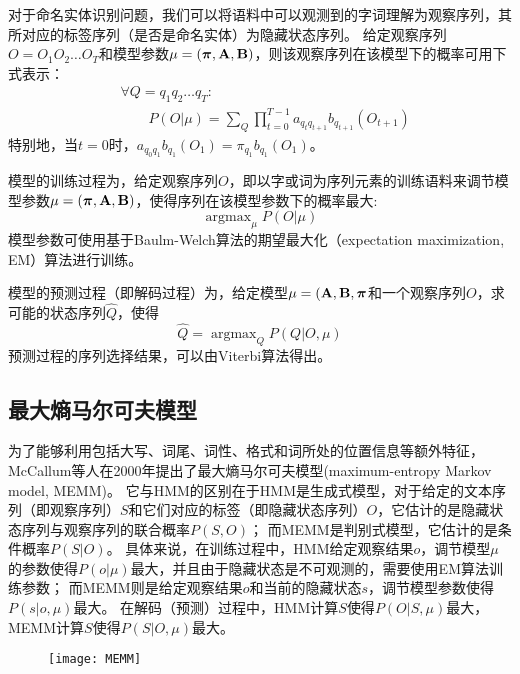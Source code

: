 对于命名实体识别问题，我们可以将语料中可以观测到的字词理解为观察序列，其所对应的标签序列（是否是命名实体）为隐藏状态序列。
给定观察序列$O = O_1 O_2\dots O_T$和模型参数$\mu = (\boldsymbol{\mathbf{\pi}},\boldsymbol{\mathbf{A}},\boldsymbol{\mathbf{B}})$，则该观察序列在该模型下的概率可用下式表示：
\begin{align}
    &\forall Q = q_1 q_2 \dots q_T:\nonumber\\
    &\qquad P(O|\mu) = \sum_Q \prod_{t=0}^{T-1}a_{q_t q_{t+1}}b_{q_{t+1}}(O_{t+1})
    \label{eq:HMM-conditional-probability}
\end{align}
特别地，当$t=0$时，$a_{q_0 q_1}b_{q_1}(O_1) = \pi_{q_1}b_{q_1}(O_1)$。

模型的训练过程为，给定观察序列$O$，即以字或词为序列元素的训练语料来调节模型参数$\mu = (\boldsymbol{\mathbf{\pi}},\boldsymbol{\mathbf{A}},\boldsymbol{\mathbf{B}})$，使得序列在该模型参数下的概率最大:
\begin{equation}
    \mathop{\arg \max}_\mu P(O|\mu)
\end{equation}
模型参数可使用基于Baulm-Welch算法的期望最大化（expectation maximization, EM）算法进行训练。

模型的预测过程（即解码过程）为，给定模型$\mu = (\boldsymbol{\mathbf{A}},\boldsymbol{\mathbf{B}},\boldsymbol{\mathbf{\pi}}$和一个观察序列$O$，求可能的状态序列$\hat{Q}$，使得
\begin{equation}
    \hat{Q} = \mathop{\arg \max}_Q P(Q|O,\mu)
\end{equation}
预测过程的序列选择结果，可以由Viterbi算法得出。

\subsection{最大熵马尔可夫模型}
为了能够利用包括大写、词尾、词性、格式和词所处的位置信息等额外特征，McCallum等人在2000年提出了最大熵马尔可夫模型(maximum-entropy Markov model, MEMM)。
它与HMM的区别在于HMM是生成式模型，对于给定的文本序列（即观察序列）$S$和它们对应的标签（即隐藏状态序列）$O$，它估计的是隐藏状态序列与观察序列的联合概率$P(S,O)$；
而MEMM是判别式模型，它估计的是条件概率$P(S|O)$。
具体来说，在训练过程中，HMM给定观察结果$o$，调节模型$\mu$的参数使得$P(o|\mu)$最大，并且由于隐藏状态是不可观测的，需要使用EM算法训练参数；
而MEMM则是给定观察结果$o$和当前的隐藏状态$s$，调节模型参数使得$P(s|o,\mu)$最大。
在解码（预测）过程中，HMM计算$S$使得$P(O|S,\mu)$最大，MEMM计算$S$使得$P(S|O,\mu)$最大。

\begin{figure}[H]
    \centering
    \texttt{[image: MEMM]}
    \label{fig:MEMM}
\end{figure}

